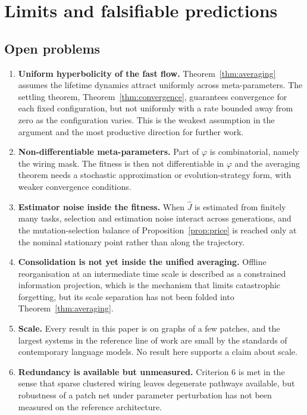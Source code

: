 \documentclass[11pt]{article}
\theoremstyle{definition}
\theoremstyle{remark}
\begin{document}
\section{Limits and falsifiable predictions}
\label{sec:limits}

\subsection{Open problems}
\begin{enumerate}
\item \textbf{Uniform hyperbolicity of the fast flow.} Theorem~\ref{thm:averaging} assumes the lifetime
dynamics attract uniformly across meta-parameters. The settling theorem, Theorem~\ref{thm:convergence},
guarantees convergence for each fixed configuration, but not uniformly with a rate bounded away from
zero as the configuration varies. This is the weakest assumption in the argument and the most productive
direction for further work.
\item \textbf{Non-differentiable meta-parameters.} Part of $\varphi$ is combinatorial, namely the wiring
mask. The fitness is then not differentiable in $\varphi$ and the averaging theorem needs a stochastic
approximation or evolution-strategy form, with weaker convergence conditions.
\item \textbf{Estimator noise inside the fitness.} When $\hat J$ is estimated from finitely many tasks,
selection and estimation noise interact across generations, and the mutation-selection balance of
Proposition~\ref{prop:price} is reached only at the nominal stationary point rather than along the
trajectory.
\item \textbf{Consolidation is not yet inside the unified averaging.} Offline reorganisation at an
intermediate time scale is described as a constrained information projection, which is the mechanism
that limits catastrophic forgetting, but its scale separation has not been folded into
Theorem~\ref{thm:averaging}.
\item \textbf{Scale.} Every result in this paper is on graphs of a few patches, and the largest systems
in the reference line of work are small by the standards of contemporary language models. No result
here supports a claim about scale.
\item \textbf{Redundancy is available but unmeasured.} Criterion 6 is met in the sense that sparse
clustered wiring leaves degenerate pathways available, but robustness of a patch net under parameter
perturbation has not been measured on the reference architecture.
\end{enumerate}
\end{document}
